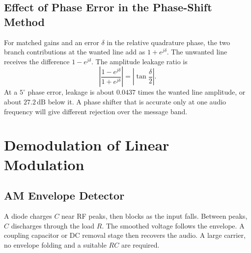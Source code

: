 \documentclass[12pt,a4paper]{article}
\begin{document}
\subsection{Effect of Phase Error in the Phase-Shift Method}
For matched gains and an error $\delta$ in the relative quadrature phase, the two branch contributions at the wanted line add as $1+e^{j\delta}$. The unwanted line receives the difference $1-e^{j\delta}$. The amplitude leakage ratio is
\[
 \left|\frac{1-e^{j\delta}}{1+e^{j\delta}}\right|
   =\left|\tan\frac{\delta}{2}\right|.
\]
At a $5^\circ$ phase error, leakage is about $0.0437$ times the wanted line amplitude, or about $27.2\,\mathrm{dB}$ below it. A phase shifter that is accurate only at one audio frequency will give different rejection over the message band.

\section{Demodulation of Linear Modulation}
\subsection{AM Envelope Detector}
\begin{tcolorbox}[defbox, title={Diode Peak Detector}]
A diode charges $C$ near RF peaks, then blocks as the input falls. Between peaks, $C$ discharges through the load $R$. The smoothed voltage follows the envelope. A coupling capacitor or DC removal stage then recovers the audio. A large carrier, no envelope folding and a suitable $RC$ are required.
\end{tcolorbox}

\begin{tcolorbox}[tikzbox, unbreakable, title={Diode Envelope Detector Circuit}]
\centering
{}\par
\end{tcolorbox}
\end{document}

